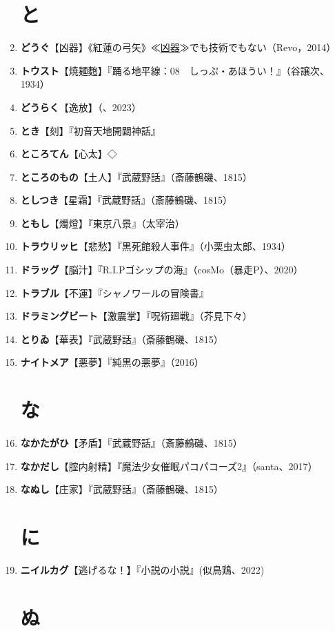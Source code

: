 \documentclass[twocolumn]{jsbook}
\newcommand{\ccite}[1]{《#1》}
\begin{document}
\begin{enumerate}
\section*{と}
    \item \textbf{どうぐ}【凶器】\ccite{紅蓮の弓矢}{≪\uline{凶器}≫でも技術でもない（Revo，2014）}
    \item \textbf{トウスト}【焼麺麭】『踊る地平線：08　しっぷ・あほうい！』（谷譲次、1934）
    \item \textbf{どうらく}【逸放】（、2023）
    \item \textbf{とき}【刻】『初音天地開闢神話』
    \item \textbf{ところてん}【心太】◇
    \item \textbf{ところのもの}【土人】『武蔵野話』（斎藤鶴磯、1815）
    \item \textbf{としつき}【星霜】『武蔵野話』（斎藤鶴磯、1815）
    \item \textbf{ともし}【燭燈】『東京八景』（太宰治）
    \item \textbf{トラウリッヒ}【悲愁】『黒死館殺人事件』（小栗虫太郎、1934）
    \item \textbf{ドラッグ}【脳汁】『R.I.Pゴシップの海』（cosMo（暴走P）、2020）
    \item \textbf{トラブル}【不運】『シャノワールの冒険書』
    \item \textbf{ドラミングビート}【激震掌】『呪術廻戦』（芥見下々）
    \item \textbf{とりゐ}【華表】『武蔵野話』（斎藤鶴磯、1815）
    \item \textbf{ナイトメア}【悪夢】『純黒の悪夢』（2016）
\section*{な}
    \item \textbf{なかたがひ}【矛盾】『武蔵野話』（斎藤鶴磯、1815）
    \item \textbf{なかだし}【腟内射精】『魔法少女催眠パコパコーズ2』（santa、2017）
    \item \textbf{なぬし}【庄家】『武蔵野話』（斎藤鶴磯、1815）
\section*{に}
    \item \textbf{ニイルカグ}【逃げるな！】『小説の小説』(似鳥鶏、2022)
\section*{ぬ}

\end{enumerate}
\end{document}
